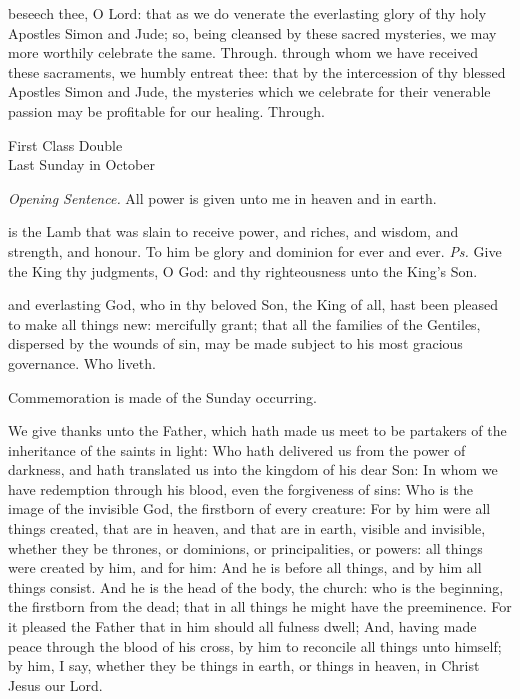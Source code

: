 \secret
{} beseech thee, O Lord: that as we do venerate the everlasting glory of thy holy Apostles Simon and Jude; so, being cleansed by these sacred mysteries, we may more worthily celebrate the same. Through.
\postcommunion
{} through whom we have received these sacraments, we humbly entreat thee: that by the intercession of thy blessed Apostles Simon and Jude, the mysteries which we celebrate for their venerable passion may be profitable for our healing. Through.

\begin{inhead}
    {First Class Double\\
Last Sunday in October}
\end{inhead}
\fancyhead[RE,LO]{}
\par\noindent
\textit{Opening Sentence.} All power is given unto me in heaven and in earth.%

\introit
{} is the Lamb that was slain to receive power, and riches, and wisdom, and strength, and honour. To him be glory and dominion for ever and ever. \textit{Ps.} Give the King thy judgments, O God: and thy righteousness unto the King's Son.

\collect
{} and everlasting God, who in thy beloved Son, the King of all, hast been pleased to make all things new: mercifully grant; that all the families of the Gentiles, dispersed by the wounds of sin, may be made subject to his most gracious governance. Who liveth.
\begin{rubric}
    Commemoration is made of the Sunday occurring.
\end{rubric}

 We give thanks unto the Father, which hath made us meet to be partakers of the inheritance of the saints in light: Who hath delivered us from the power of darkness, and hath translated us into the kingdom of his dear Son: In whom we have redemption through his blood, even the forgiveness of sins: Who is the image of the invisible God, the firstborn of every creature: For by him were all things created, that are in heaven, and that are in earth, visible and invisible, whether they be thrones, or dominions, or principalities, or powers: all things were created by him, and for him: And he is before all things, and by him all things consist. And he is the head of the body, the church: who is the beginning, the firstborn from the dead; that in all things he might have the preeminence. For it pleased the Father that in him should all fulness dwell; And, having made peace through the blood of his cross, by him to reconcile all things unto himself; by him, I say, whether they be things in earth, or things in heaven, %
in Christ Jesus our Lord.


